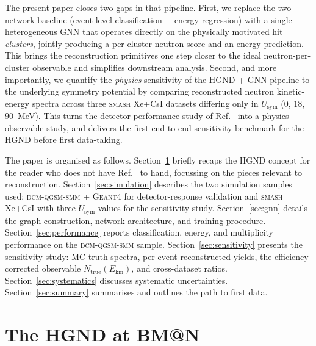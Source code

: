 \documentclass[aps,prc,twocolumn,superscriptaddress,showpacs,%
               nofootinbib,floatfix,longbibliography]{revtex4-2}
\newcommand{\Ekin}{E_{\text{kin}}}
\newcommand{\Ntrue}{N_{\text{true}}}
\newcommand{\Usym}{U_{\text{sym}}}
\newcommand{\HGND}{HGND}
\newcommand{\SMASH}{\textsc{smash}}
\newcommand{\DCM}{\textsc{dcm-qgsm-smm}}
\newcommand{\GEANT}{\textsc{Geant4}}
\begin{document}
The present paper closes two gaps in that pipeline.
First, we replace the two-network baseline (event-level classification
+ energy regression) with a single heterogeneous GNN that operates
directly on the physically motivated hit \emph{clusters}, jointly
producing a per-cluster neutron score and an energy prediction.  This
brings the reconstruction primitives one step closer to the ideal
neutron-per-cluster observable and simplifies downstream analysis.
Second, and more importantly, we quantify the \emph{physics}
sensitivity of the \HGND{} + GNN pipeline to the underlying symmetry
potential by comparing reconstructed neutron kinetic-energy spectra
across three \SMASH{} Xe+CsI datasets differing only in $\Usym$
($0$, $18$, $90$~MeV).  This turns the detector performance study of
Ref.~\cite{Morozov2024HGND} into a physics-observable study, and
delivers the first end-to-end sensitivity benchmark for the \HGND{}
before first data-taking.

The paper is organised as follows.
Section~\ref{sec:detector} briefly recaps the \HGND{} concept for the
reader who does not have Ref.~\cite{Morozov2024HGND} to hand, focussing
on the pieces relevant to reconstruction.
Section~\ref{sec:simulation} describes the two simulation samples
used: \DCM{} + \GEANT{} for detector-response validation and \SMASH{}
Xe+CsI with three $\Usym$ values for the sensitivity study.
Section~\ref{sec:gnn} details the graph construction, network
architecture, and training procedure.
Section~\ref{sec:performance} reports classification, energy, and
multiplicity performance on the \DCM{} sample.
Section~\ref{sec:sensitivity} presents the sensitivity study: MC-truth
spectra, per-event reconstructed yields, the efficiency-corrected
observable $\Ntrue(\Ekin)$, and cross-dataset ratios.
Section~\ref{sec:systematics} discusses systematic uncertainties.
Section~\ref{sec:summary} summarises and outlines the path to first
data.

\section{The HGND at BM@N}
\label{sec:detector}
\end{document}
